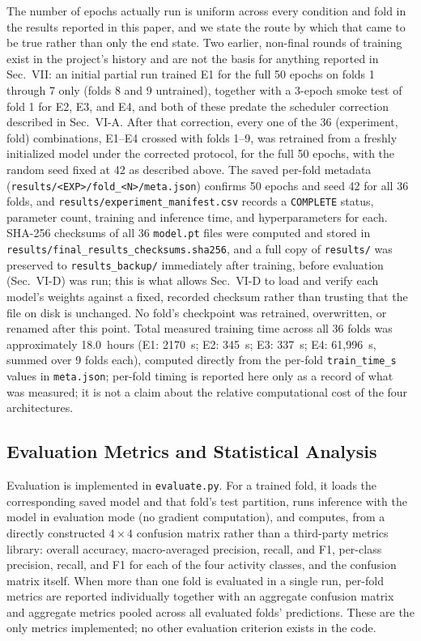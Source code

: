\documentclass[conference]{IEEEtran}
\begin{document}
The number of epochs actually run is uniform across every condition
and fold in the results reported in this paper, and we state the
route by which that came to be true rather than only the end state.
Two earlier, non-final rounds of training exist in the project's
history and are not the basis for anything reported in Sec.~VII:
an initial partial run trained E1 for the full 50 epochs on folds 1
through 7 only (folds 8 and 9 untrained), together with a 3-epoch
smoke test of fold 1 for E2, E3, and E4, and both of these predate
the scheduler correction described in Sec.~VI-A. After that
correction, every one of the 36 (experiment, fold) combinations,
E1--E4 crossed with folds 1--9, was retrained from a freshly
initialized model under the corrected protocol, for the full 50
epochs, with the random seed fixed at 42 as described above. The
saved per-fold metadata
(\texttt{results/<EXP>/fold\_<N>/meta.json}) confirms 50 epochs and
seed 42 for all 36 folds, and \texttt{results/experiment\_manifest.csv}
records a \texttt{COMPLETE} status, parameter count, training and
inference time, and hyperparameters for each. SHA-256 checksums of
all 36 \texttt{model.pt} files were computed and stored in
\texttt{results/final\_results\_checksums.sha256}, and a full copy of
\texttt{results/} was preserved to \texttt{results\_backup/}
immediately after training, before evaluation (Sec.~VI-D) was run;
this is what allows Sec.~VI-D to load and verify each model's weights
against a fixed, recorded checksum rather than trusting that the file
on disk is unchanged. No fold's checkpoint was retrained,
overwritten, or renamed after this point. Total measured training
time across all 36 folds was approximately 18.0~hours
(E1: 2170~s; E2: 345~s; E3: 337~s; E4: 61{,}996~s, summed over 9
folds each), computed directly from the per-fold \texttt{train\_time\_s}
values in \texttt{meta.json}; per-fold timing is reported here only
as a record of what was measured; it is not a claim about the
relative computational cost of the four architectures.

\subsection{Evaluation Metrics and Statistical Analysis}
\label{subsec:eval-metrics}

Evaluation is implemented in \texttt{evaluate.py}. For a trained
fold, it loads the corresponding saved model and that fold's test
partition, runs inference with the model in evaluation mode (no
gradient computation), and computes, from a directly constructed
$4\times4$ confusion matrix rather than a third-party metrics
library: overall accuracy, macro-averaged precision, recall, and
F1, per-class precision, recall, and F1 for each of the four
activity classes, and the confusion matrix itself. When more than
one fold is evaluated in a single run, per-fold metrics are reported
individually together with an aggregate confusion matrix and
aggregate metrics pooled across all evaluated folds' predictions.
These are the only metrics implemented; no other evaluation
criterion exists in the code.
\end{document}
